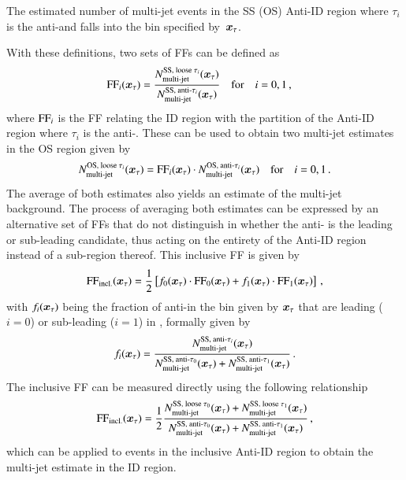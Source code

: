 {\begin{description}[style=standard]
  \item[$\NmjAntiID{SS(OS)}{i}\ffargs$] The estimated number of multi-jet events
    in the SS (OS) Anti-ID region where $\tau_i$ is the anti-\tauhadvis and
    falls into the bin specified by~$\bm{x}_\tau$.
  \end{description}
  With these definitions, two sets of FFs can be defined as
  \begin{align*}
    \text{FF}_{i}( \bm{x}_{\tau} ) &= \frac{N_\text{multi-jet}^{\text{SS, loose }\tau_{i}} ( \bm{x}_{\tau} )}{N_\text{multi-jet}^{\text{SS, anti-}\tau_{i}}( \bm{x}_{\tau} )}
                     \quad \text{for} \quad i = 0, 1 \,\text{,}
  \end{align*}
  where $\text{FF}_{i}$ is the FF relating the ID region with the partition of the
  Anti-ID region where $\tau_i$ is the anti-\tauhadvis. These can be used to
  obtain two multi-jet estimates in the OS region given by
  \begin{align*}
    N_\text{multi-jet}^{\text{OS, loose }\tau_{i}}( \bm{x}_{\tau} ) = \text{FF}_{i}( \bm{x}_{\tau} ) \cdot N_\text{multi-jet}^{\text{OS, anti-}\tau_{i}}( \bm{x}_{\tau} )
    \quad \text{for} \quad i = 0, 1 \,\text{.}
  \end{align*}
  The average of both estimates also yields an estimate of the multi-jet
  background. The process of averaging both estimates can be expressed by an
  alternative set of FFs that do not distinguish in whether the anti-\tauhadvis
  is the leading or sub-leading \tauhadvis candidate, thus acting on the
  entirety of the Anti-ID region instead of a sub-region thereof. This inclusive
  FF is given by
  \begin{align*}
    \text{FF}_\text{incl.}( \bm{x}_{\tau} ) = \frac{1}{2} \left[ f_0( \bm{x}_{\tau} ) \cdot \text{FF}_0( \bm{x}_{\tau} )
    + f_1( \bm{x}_{\tau} ) \cdot \text{FF}_1( \bm{x}_{\tau} ) \right] \,\text{,}
  \end{align*}
  with $f_i( \bm{x}_{\tau} )$ being the fraction of anti-\tauhadvis in the bin given by
  $\bm{x}_\tau$ that are leading ($i = 0$) or sub-leading ($i = 1$) in \pT,
  formally given by
  \begin{align*}
    f_i( \bm{x}_{\tau} ) = \frac{N_\text{multi-jet}^{\text{SS, anti-}\tau_{i}}( \bm{x}_{\tau} )}
                      {N_\text{multi-jet}^{\text{SS, anti-}\tau_{0}}( \bm{x}_{\tau} ) + N_\text{multi-jet}^{\text{SS, anti-}\tau_{1}}( \bm{x}_{\tau} )} \,\text{.}
  \end{align*}
  The inclusive FF can be measured directly using the following relationship
  \begin{align}
    \text{FF}_\text{incl.}( \bm{x}_{\tau} )
    = \frac{1}{2} \frac{ N_\text{multi-jet}^{\text{SS, loose }\tau_{0}}( \bm{x}_{\tau} ) + N_\text{multi-jet}^{\text{SS, loose }\tau_{1}}( \bm{x}_{\tau} ) }
                       { N_\text{multi-jet}^{\text{SS, anti-}\tau_{0}}( \bm{x}_{\tau} ) + N_\text{multi-jet}^{\text{SS, anti-}\tau_{1}}( \bm{x}_{\tau} ) } \,\text{,}
    \label{eq:inclusive_fake_factor}
  \end{align}
  which can be applied to events in the inclusive Anti-ID region to obtain the
  multi-jet estimate in the ID region.

}
